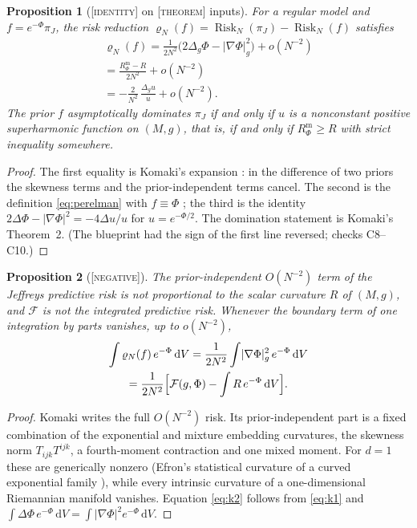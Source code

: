 \documentclass[a4paper,11pt,noarxiv]{quantumarticle}
\newcommand{\Rm}{R^{\mathrm m}}
\newcommand{\Risk}{\operatorname{Risk}}
\newcommand{\abs}[1]{\lvert #1\rvert}
\newcommand{\dd}{\,\mathrm{d}}
\newcommand{\grad}{\nabla}
\newcommand{\status}[1]{\textsc{\small [#1]}}
\theoremstyle{plain}
\newtheorem{proposition}{Proposition}
\theoremstyle{definition}
\theoremstyle{remark}
\begin{document}
\begin{proposition}[\status{identity} on \status{theorem} inputs]
\label{prop:k1}
For a regular model and $f=e^{-\Phi}\pi_J$, the risk reduction
$\varrho_N(f)=\Risk_N(\pi_J)-\Risk_N(f)$ satisfies
\begin{multline}\label{eq:k1}
\varrho_N(f)
=\frac{1}{2N^2}\bigl(2\Delta_g\Phi-\abs{\grad\Phi}_g^2\bigr)+o(N^{-2})\\
=\frac{\Rm_\Phi-R}{2N^2}+o(N^{-2})\\
=-\frac{2}{N^2}\,\frac{\Delta_g u}{u}+o(N^{-2}).
\end{multline}
The prior $f$ asymptotically dominates $\pi_J$ if and only if $u$ is a
nonconstant positive superharmonic function on $(M,g)$, that is, if and
only if $\Rm_\Phi\ge R$ with strict inequality somewhere.
\end{proposition}

\begin{proof}
The first equality is Komaki's expansion \cite[eqs.\ (3)--(5)]{komaki2006}:
in the difference of two priors the skewness terms and the
prior-independent terms cancel. The second is the definition
\eqref{eq:perelman} with $f\equiv\Phi$ \cite[Remark 1.3]{perelman2002};
the third is the identity $2\Delta\Phi-\abs{\grad\Phi}^2=-4\Delta u/u$
for $u=e^{-\Phi/2}$. The domination statement is Komaki's Theorem~2.
(The blueprint had the sign of the first line reversed; checks C8--C10.)
\end{proof}

\begin{proposition}[\status{negative}]\label{prop:k2}
The prior-independent $O(N^{-2})$ term of the Jeffreys predictive risk
is not proportional to the scalar curvature $R$ of $(M,g)$, and
$\mathcal F$ is not the integrated predictive risk. Whenever the
boundary term of one integration by parts vanishes, up to $o(N^{-2})$,
\begin{multline}\label{eq:k2}
\int\varrho_N(f)\,e^{-\Phi}\dd V
=\frac{1}{2N^2}\int\abs{\grad\Phi}_g^2\,e^{-\Phi}\dd V\\
=\frac{1}{2N^2}\Bigl[\mathcal F(g,\Phi)-\int R\,e^{-\Phi}\dd V\Bigr].
\end{multline}
\end{proposition}

\begin{proof}
Komaki \cite[Theorem A1, eq.\ (29)]{komaki2015} writes the full
$O(N^{-2})$ risk. Its prior-independent part is a fixed combination of
the exponential and mixture embedding curvatures, the skewness norm
$T_{ijk}T^{ijk}$, a fourth-moment contraction and one mixed moment. For
$d=1$ these are generically nonzero (Efron's statistical curvature of
a curved exponential family \cite{efron1975}), while every intrinsic
curvature of a one-dimensional Riemannian manifold vanishes. Equation
\eqref{eq:k2} follows from \eqref{eq:k1} and
$\int\Delta\Phi\,e^{-\Phi}\dd V=\int\abs{\grad\Phi}^2e^{-\Phi}\dd V$.
\end{proof}
\end{document}
